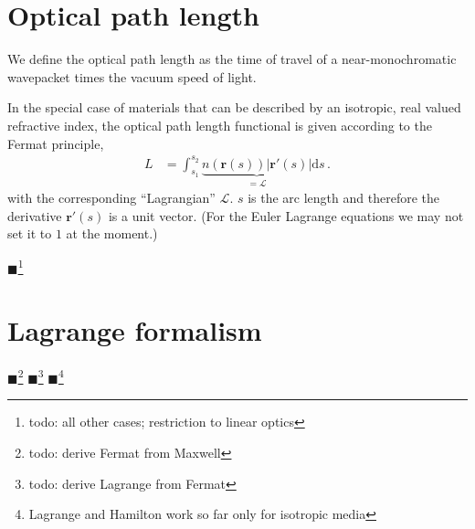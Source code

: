 \documentclass[12pt,a4paper,twoside,openright,BCOR10mm,headsepline,titlepage,abstracton,chapterprefix,final]{scrreprt}
\newcommand\Vector[1]{{\mathbf{#1}}}
\newcommand{\remark}[1]{{\color{red}$\blacksquare$}\footnote{{\color{red}#1}}}
\begin{document}
\section{Optical path length}
We define the optical path length as the time of travel of a near-monochromatic wavepacket times the vacuum speed of light.

In the special case of materials that can be described by an isotropic, real valued refractive index, the optical path length functional is given according to the Fermat principle,
\begin{align}
 L &= \int_{s_1}^{s_2} \underbrace{n(\Vector{r}(s)) |\Vector{r}'(s)|}_{=\mathcal{L}} \text{d}s\,.\label{eq:fermatiso}
\end{align}
with the corresponding ``Lagrangian'' $\mathcal{L}$.
$s$ is the arc length and therefore the derivative $\Vector{r}'(s)$ is a unit vector. (For the Euler Lagrange
equations we may not set it to $1$ at the moment.)

\remark{todo: all other cases; restriction to linear optics}

\section{Lagrange formalism}
\remark{todo: derive Fermat from Maxwell}
\remark{todo: derive Lagrange from Fermat}
\remark{Lagrange and Hamilton work so far only for isotropic media}
\end{document}
